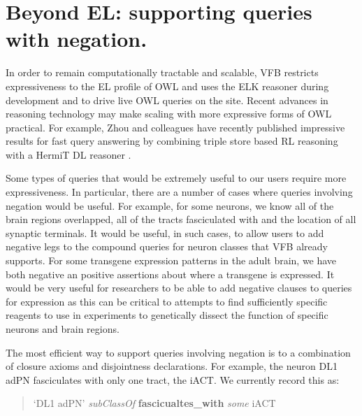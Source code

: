 \documentclass[runningheads,a4paper]{llncs}
\begin{document}

% 

 
\section{Beyond EL: supporting queries with negation.}

In order to remain computationally tractable and scalable, VFB
restricts expressiveness to the EL profile of OWL and uses the ELK
reasoner \cite{kazakov2012elk} during development and to drive live
OWL queries on the site. Recent advances in reasoning
technology may make scaling with more expressive forms of OWL
practical. For example, Zhou and colleagues have recently published
impressive results for fast query answering by combining triple store
based RL reasoning with a HermiT DL reasoner \cite{ZNCH14a}.

Some types of queries that would be extremely useful to our users
require more expressiveness.  In particular, there are a number of
cases where queries involving negation would be useful.  For example,
for some neurons, we know all of the brain regions overlapped, all of
the tracts fasciculated with and the location of all synaptic
terminals.  It would be useful, in such cases, to allow users to add
negative legs to the compound queries for neuron classes that VFB
already supports.  For some transgene expression
patterns in the adult brain, we have both negative an positive
assertions about where a transgene is expressed.  It would be very
useful for researchers to be able to add negative clauses to queries for
expression as this can be critical to attempts to find sufficiently
specific reagents to use in experiments to genetically dissect the
function of specific neurons and brain regions.

The most efficient way to support queries involving negation is to a
combination of closure axioms and disjointness declarations.  For
example, the neuron DL1 adPN fasciculates with only one tract, the
iACT.  We currently record this as:


\begin{quote} 
`DL1 adPN' \textit{subClassOf} \textbf{fascicualtes\_with} \textit{some} iACT
\end{quote}
\end{document}

